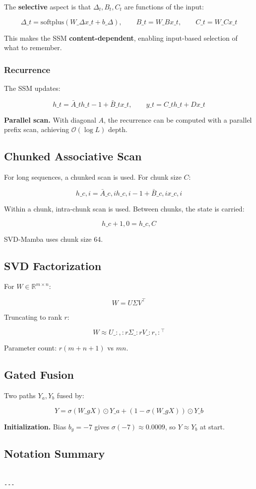 The \textbf{selective} aspect is that $\Delta_t, B_t, C_t$ are functions of the 
input:

\[
\Delta\_t = \text{softplus}(W\_\Delta x\_t + b\_\Delta), \qquad
B\_t = W\_B x\_t, \qquad
C\_t = W\_C x\_t
\tag{3.7}
\]

This makes the SSM \textbf{content-dependent}, enabling input-based selection 
of what to remember.

\subsubsection{Recurrence}

The SSM updates:

\[
h\_t = \bar{A}\_t h\_{t-1} + \bar{B}\_t x\_t, \qquad
y\_t = C\_t h\_t + D x\_t
\tag{3.8}
\]

\textbf{Parallel scan.} With diagonal $A$, the recurrence can be computed with 
a parallel prefix scan, achieving $\mathcal{O}(\log L)$ depth.

\subsection{Chunked Associative Scan}

For long sequences, a chunked scan is used. For chunk size $C$:

\[
h\_{c, i} = \bar{A}\_{c, i} h\_{c, i-1} + \bar{B}\_{c, i} x\_{c, i}
\tag{3.9}
\]

Within a chunk, intra-chunk scan is used. Between chunks, the state is 
carried:

\[
h\_{c+1, 0} = h\_{c, C}
\tag{3.10}
\]

SVD-Mamba uses chunk size 64.

\subsection{SVD Factorization}

For $W \in \mathbb{R}^{m \times n}$:

\[
W = U \Sigma V^\top
\tag{3.11}
\]

Truncating to rank $r$:

\[
W \approx U\_{:, :r} \Sigma\_{:r} V\_{:r, :}^\top
\tag{3.12}
\]

Parameter count: $r(m + n + 1)$ vs $mn$.

\subsection{Gated Fusion}

Two paths $Y_a, Y_b$ fused by:

\[
Y = \sigma(W\_g X) \odot Y\_a + (1 - \sigma(W\_g X)) \odot Y\_b
\tag{3.13}
\]

\textbf{Initialization.} Bias $b_g = -7$ gives $\sigma(-7) \approx 0.0009$, so 
$Y \approx Y_b$ at start.

\subsection{Notation Summary}

\begin{lstlisting}

---
\end{lstlisting}